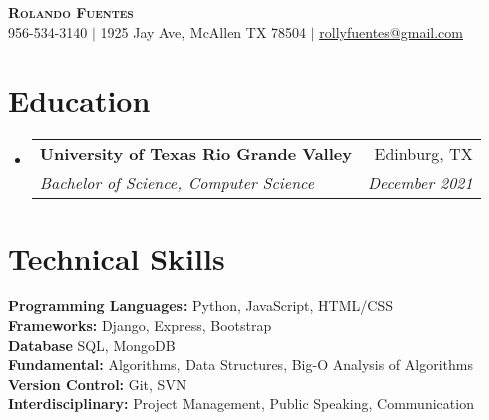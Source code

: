 \documentclass[letterpaper,11pt]{article}
\makeatletter
\newcommand{\resumeSubheading}[4]{
  \vspace{-2pt}\item
    \begin{tabular*}{0.97\textwidth}[t]{l@{\extracolsep{\fill}}r}
      \textbf{#1} & #2 \\
      \textit{\small#3} & \textit{\small #4} \\
    \end{tabular*}\vspace{-7pt}
}
\newcommand{\resumeSubHeadingListStart}{\begin{itemize}[leftmargin=0.15in, label={}]}
\newcommand{\resumeSubHeadingListEnd}{\end{itemize}}
\makeatother
\begin{document}
\begin{center}
    \textbf{\Huge \scshape Rolando Fuentes} \\ \vspace{1pt}
    \small 956-534-3140 $|$ 
    1925 Jay Ave, McAllen TX 78504 $|$ 
    \href{mailto:rollyfuentes@gmail.com}{\underline{rollyfuentes@gmail.com}} 
\end{center}
\section{Education}
  \resumeSubHeadingListStart
    \resumeSubheading
      {University of Texas Rio Grande Valley}{Edinburg, TX}
      {Bachelor of Science, Computer Science}{December 2021}
  \resumeSubHeadingListEnd
\section{Technical Skills}
 \begin{itemize}[leftmargin=0.15in, label={}]
    \small{\item{
        \textbf{Programming Languages:} Python, JavaScript, HTML/CSS \\
        \textbf{Frameworks:} Django, Express, Bootstrap \\
        \textbf{Database} SQL, MongoDB \\
        \textbf{Fundamental:} Algorithms, Data Structures, Big-O Analysis of Algorithms \\ 
        \textbf{Version Control:} Git, SVN \\ 
        \textbf{Interdisciplinary:} Project Management, Public Speaking, Communication \\ }}
 \end{itemize}
%  
\end{document}
